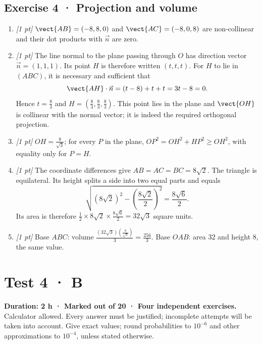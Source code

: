 \subsection*{Exercise 4 · Projection and volume}\begin{enumerate}

\item \textit{[1 pt]} $\vect{AB}=(-8,8,0)$ and $\vect{AC}=(-8,0,8)$ are non-collinear and their dot products with $\vec n$ are zero.

\item \textit{[1 pt]} The line normal to the plane passing through $O$ has direction vector $\vec n=(1,1,1)$. Its point $H$ is therefore written $(t,t,t)$. For $H$ to lie in $(ABC)$, it is necessary and sufficient that
\[\vect{AH}\cdot\vec n=(t-8)+t+t=3t-8=0.\]
Hence $t=\frac{8}{3}$ and $H=(\frac{8}{3},\frac{8}{3},\frac{8}{3})$. This point lies in the plane and $\vect{OH}$ is collinear with the normal vector; it is indeed the required orthogonal projection.

\item \textit{[1 pt]} $OH=\frac{8}{\sqrt{3}}$; for every $P$ in the plane, $OP^2=OH^2+HP^2\ge OH^2$, with equality only for $P=H$.

\item \textit{[1 pt]} The coordinate differences give $AB=AC=BC=8\sqrt2$. The triangle is equilateral. Its height splits a side into two equal parts and equals
\[\sqrt{(8\sqrt2)^2-(\frac{8\sqrt{2}}{2})^2}=\frac{8\sqrt6}{2}.\]
Its area is therefore $\frac12\times 8\sqrt2\times\frac{8\sqrt6}{2}=32\sqrt3$ square units.

\item \textit{[1 pt]} Base $ABC$: volume $\frac{(32\sqrt3)(\frac{8}{\sqrt{3}})}{3}=\frac{256}{3}$. Base $OAB$: area $32$ and height $8$, the same value.

\end{enumerate}

\fi

\fi

\ifmxteacher

\mxnewpage{}\label{sujet:6-4}

\section*{Test 4 · B}


\textbf{Duration: 2 h · Marked out of 20 · Four independent exercises.}\\Calculator allowed. Every answer must be justified; incomplete attempts will be taken into account. Give exact values; round probabilities to $10^{-6}$ and other approximations to $10^{-4}$, unless stated otherwise.

